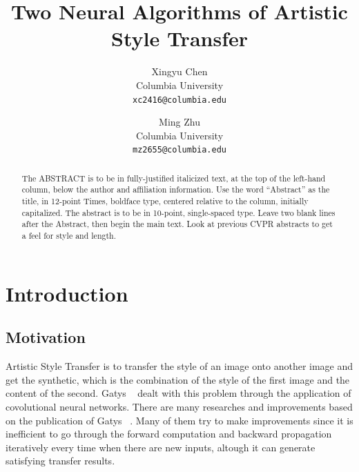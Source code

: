 \documentclass[10pt,twocolumn,letterpaper]{article}
\begin{document}
\title{Two Neural Algorithms of Artistic Style Transfer}

\author{Xingyu Chen\\
Columbia University\\
{\tt\small xc2416@columbia.edu}
\and
Ming Zhu\\
Columbia University\\
{\tt\small mz2655@columbia.edu}
}


\maketitle

\begin{abstract}
   The ABSTRACT is to be in fully-justified italicized text, at the top
   of the left-hand column, below the author and affiliation
   information. Use the word ``Abstract'' as the title, in 12-point
   Times, boldface type, centered relative to the column, initially
   capitalized. The abstract is to be in 10-point, single-spaced type.
   Leave two blank lines after the Abstract, then begin the main text.
   Look at previous CVPR abstracts to get a feel for style and length.
\end{abstract}


\section{Introduction}

\subsection{Motivation}
Artistic Style Transfer is to transfer the style of an image onto another image and get the synthetic, which is the combination of the style of the first image and the content of the second. Gatys \etal~\cite{Authors01} dealt with this problem through the application of covolutional neural networks. There are many researches and improvements based on the publication of Gatys \etal~\cite{Authors01}. Many of them try to make improvements since it is inefficient to go through the forward computation and backward propagation iteratively every time when there are new inputs, altough it can generate satisfying transfer results. 
\end{document}
